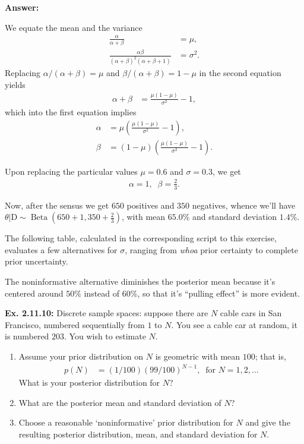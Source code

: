 \documentclass{article}
\newcommand\oname\operatorname
\begin{document}
\textbf{Answer:}

We equate the mean and the variance
\begin{align*}
	\frac\alpha{\alpha+\beta}&=\mu,\\
	\frac{\alpha\beta}{(\alpha+\beta)^2(\alpha+\beta+1)}&=\sigma^2.
\end{align*}
Replacing $\alpha/(\alpha+\beta)=\mu$ and $\beta/(\alpha+\beta)=1-\mu$ in the second equation yields
\begin{align*}
	\alpha+\beta&=\frac{\mu\left(1-\mu\right)}{\sigma^2}-1,
\end{align*}
which into the first equation implies
\begin{align*}
	\alpha&=\mu\left(\frac{\mu\left(1-\mu\right)}{\sigma^2}-1\right),\\
	\beta&=(1-\mu)\left(\frac{\mu\left(1-\mu\right)}{\sigma^2}-1\right).
\end{align*}

Upon replacing the particular values $\mu=0.6$ and $\sigma=0.3$, we get
\begin{align*}
	\alpha=1,\;\;\beta=\frac23.
\end{align*}

Now, after the sensus we get $650$ positives and $350$ negatives, whence we'll have $\theta|\text{D}\sim\oname{Beta}(650+1, 350+\frac23)$, with mean $65.0\%$ and standard deviation $1.4\%$.

The following table, calculated in the corresponding script to this exercise, evaluates a few alternatives for $\sigma$, ranging from \textit{whoa} prior certainty to complete prior uncertainty.


The noninformative alternative diminishes the posterior mean because it's centered around $50\%$ instead of $60\%$, so that it's ``pulling effect'' is more evident.

\textbf{Ex. 2.11.10: }Discrete sample spaces: suppose there are $N$ cable cars in San Francisco, numbered sequentially from $1$ to $N$. You see a cable car at random, it is numbered $203$. You wish to estimate $N$.
\begin{enumerate}[label=\alph*]
	\item Assume your prior distribution on $N$ is geometric with mean $100$; that is,
		\begin{align*}
			p(N)&=(1/100)(99/100)^{N-1},\;\;\text{for }N=1,2,...
		\end{align*}
	      What is your posterior distribution for $N$?
      \item What are the posterior mean and standard deviation of $N$?
      \item Choose a reasonable `noninformative' prior distribution for $N$ and give the resulting posterior distribution, mean, and standard deviation for $N$.
\end{enumerate}
\end{document}
